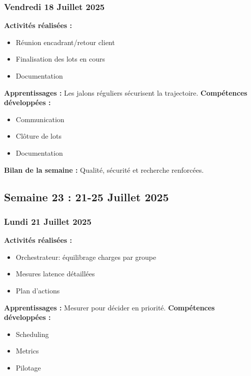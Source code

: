 \documentclass[12pt,a4paper]{article}
\begin{document}
\subsubsection{Vendredi 18 Juillet 2025}
\textbf{Activités réalisées :}
\begin{itemize}
    \item Réunion encadrant/retour client
    \item Finalisation des lots en cours
    \item Documentation
\end{itemize}
\textbf{Apprentissages :} Les jalons réguliers sécurisent la trajectoire.
\textbf{Compétences développées :}
\begin{itemize}
    \item Communication
    \item Clôture de lots
    \item Documentation
\end{itemize}
\textbf{Bilan de la semaine :} Qualité, sécurité et recherche renforcées.

\clearpage
\subsection{Semaine 23 : 21-25 Juillet 2025}

\subsubsection{Lundi 21 Juillet 2025}
\textbf{Activités réalisées :}
\begin{itemize}
    \item Orchestrateur: équilibrage charges par groupe
    \item Mesures latence détaillées
    \item Plan d'actions
\end{itemize}
\textbf{Apprentissages :} Mesurer pour décider en priorité.
\textbf{Compétences développées :}
\begin{itemize}
    \item Scheduling
    \item Metrics
    \item Pilotage
\end{itemize}
\end{document}
